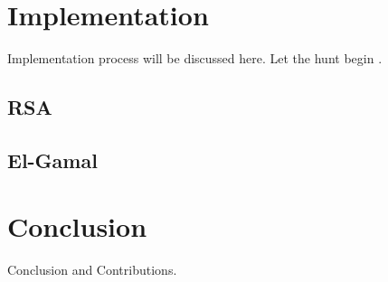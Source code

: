 \documentclass[12pt,journal,compsoc]{IEEEtran}
\begin{document}
\section{Implementation}
\label{sec:implementation}


Implementation process will be discussed here. Let the hunt begin \cite{ref:Elgamal1985}.

\subsection{RSA}

\subsection{El-Gamal}


\section{Conclusion}
Conclusion and Contributions.




%
%

\end{document}

